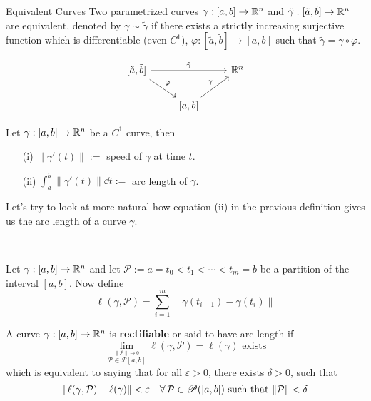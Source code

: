\documentclass[../Analysis-3.tex]{subfiles}
\begin{document}
\begin{Def}{Equivalent Curves}{}
  Two parametrized curves $\gamma : [a,b] \to \mathbb{R}^n$ and $\tilde{\gamma} : [\tilde{a}, \tilde{b}] \to \mathbb{R}^n$ are equivalent, denoted by $\gamma \sim \tilde{\gamma}$ if there exists a strictly increasing surjective function which is differentiable (even $C^1$), $\varphi : [\tilde{a},\tilde{b}] \to [a,b]$ such that $\tilde{\gamma} = \gamma \circ \varphi$.

  \[\begin{tikzcd}
      {[\tilde{a}, \tilde{b}]} && {\R^n} \\
      & {[a, b]}
      \arrow["\varphi", from=1-1, to=2-2]
      \arrow["\gamma", from=2-2, to=1-3]
      \arrow["{\tilde{\gamma}}", from=1-1, to=1-3]
    \end{tikzcd}\]
\end{Def}

\begin{Def}{}{}
  Let $\gamma : [a,b] \to \mathbb{R}^n$ be a $C^1$ curve, then
  \begin{enumerate}
    \item[(i)] $\| \gamma'(t) \| :=$ speed of $\gamma$ at time $t$.
    \item[(ii)] $\displaystyle\int_a^b \| \gamma'(t) \| \dd t :=$ arc length of $\gamma$.
  \end{enumerate}
\end{Def}

Let's try to look at more natural how equation (ii) in the previous definition gives us the arc length of a curve $\gamma$.

\

Let $\gamma : [a,b] \to \mathbb{R}^n$ and let $\mathcal{P} := a = t_0 < t_1 < \cdots < t_m = b $ be a partition of the interval $[a,b]$. Now define
\[
  \ell(\gamma,\mathcal{P}) = \sum_{i=1}^m \| \gamma(t_{i-1}) - \gamma(t_i) \|
\]


\begin{Def}{}{}
  A curve $\gamma : [a,b] \to \mathbb{R}^n$ is \textbf{rectifiable} or said to have arc length if
  \[
    \lim_{\overset{\|\mathcal{P}\| \to 0}{\mathcal{P} \in \mathscr{P}[a,b]}} \ell(\gamma,\mathcal{P}) = \ell(\gamma) \mbox{ exists}
  \]
  which is equivalent to saying that for all $\varepsilon > 0$, there exists $\delta >0$, such that
  \[
    \norm{\ell(\gamma,\mathcal{P}) - \ell(\gamma)} < \varepsilon \quad \forall \, \mathcal{P} \in \mathscr{P}([a,b]) \mbox{ such that } \norm{\mathcal{P}} < \delta
  \]
\end{Def}
\end{document}
